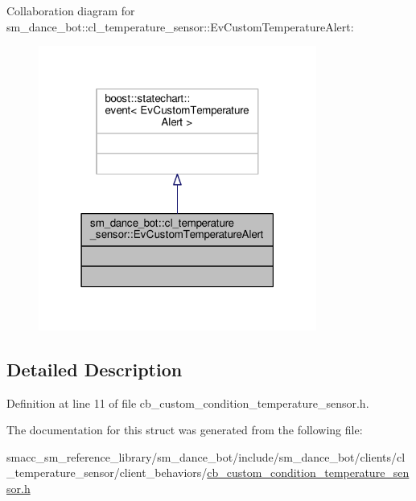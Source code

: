 Collaboration diagram for sm\+\_\+dance\+\_\+bot\+:\+:cl\+\_\+temperature\+\_\+sensor\+:\+:Ev\+Custom\+Temperature\+Alert\+:\nopagebreak
\begin{figure}[H]
\begin{center}
\leavevmode
\includegraphics[width=259pt]{structsm__dance__bot_1_1cl__temperature__sensor_1_1EvCustomTemperatureAlert__coll__graph}
\end{center}
\end{figure}


\subsection{Detailed Description}


Definition at line 11 of file cb\+\_\+custom\+\_\+condition\+\_\+temperature\+\_\+sensor.\+h.



The documentation for this struct was generated from the following file\+:\begin{DoxyCompactItemize}
\item 
smacc\+\_\+sm\+\_\+reference\+\_\+library/sm\+\_\+dance\+\_\+bot/include/sm\+\_\+dance\+\_\+bot/clients/cl\+\_\+temperature\+\_\+sensor/client\+\_\+behaviors/\hyperlink{cb__custom__condition__temperature__sensor_8h}{cb\+\_\+custom\+\_\+condition\+\_\+temperature\+\_\+sensor.\+h}\end{DoxyCompactItemize}
